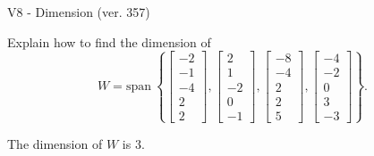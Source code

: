 \begin{exercise}
  \begin{exerciseTitle}V8 - Dimension (ver. 357)\end{exerciseTitle}
  \begin{exerciseStatement}
    Explain how to find the dimension of 
\[W=\mathrm{span}\ \left\{\left[\begin{array}{r}
-2 \\
-1 \\
-4 \\
2 \\
2
\end{array}\right] , \left[\begin{array}{r}
2 \\
1 \\
-2 \\
0 \\
-1
\end{array}\right] , \left[\begin{array}{r}
-8 \\
-4 \\
2 \\
2 \\
5
\end{array}\right] , \left[\begin{array}{r}
-4 \\
-2 \\
0 \\
3 \\
-3
\end{array}\right]\right\}.\]



  \end{exerciseStatement}
  \begin{exerciseAnswer}
   The dimension of \(W\) is  \(3\).
  


  \end{exerciseAnswer}
\end{exercise}